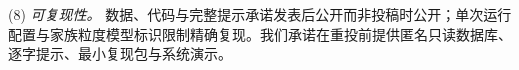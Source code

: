 \documentclass[11pt]{article}
\begin{document}
(8) \textit{{\cjkfont 可\allowbreak 复\allowbreak 现\allowbreak 性\allowbreak 。}} {\cjkfont 数\allowbreak 据\allowbreak 、\allowbreak 代\allowbreak 码\allowbreak 与\allowbreak 完\allowbreak 整\allowbreak 提\allowbreak 示\allowbreak 承\allowbreak 诺\allowbreak 发\allowbreak 表\allowbreak 后\allowbreak 公\allowbreak 开\allowbreak 而\allowbreak 非\allowbreak 投\allowbreak 稿\allowbreak 时\allowbreak 公\allowbreak 开\allowbreak ；\allowbreak 单\allowbreak 次\allowbreak 运\allowbreak 行\allowbreak 配\allowbreak 置\allowbreak 与\allowbreak 家\allowbreak 族\allowbreak 粒\allowbreak 度\allowbreak 模\allowbreak 型\allowbreak 标\allowbreak 识\allowbreak 限\allowbreak 制\allowbreak 精\allowbreak 确\allowbreak 复\allowbreak 现\allowbreak 。\allowbreak 我\allowbreak 们\allowbreak 承\allowbreak 诺\allowbreak 在\allowbreak 重\allowbreak 投\allowbreak 前\allowbreak 提\allowbreak 供\allowbreak 匿\allowbreak 名\allowbreak 只\allowbreak 读\allowbreak 数\allowbreak 据\allowbreak 库\allowbreak 、\allowbreak 逐\allowbreak 字\allowbreak 提\allowbreak 示\allowbreak 、\allowbreak 最\allowbreak 小\allowbreak 复\allowbreak 现\allowbreak 包\allowbreak 与\allowbreak 系\allowbreak 统\allowbreak 演\allowbreak 示\allowbreak 。}
\end{document}
